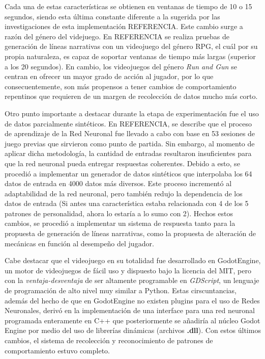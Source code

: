 \documentclass[conference]{IEEEtran}
\begin{document}
Cada una de estas características se obtienen en ventanas de tiempo de 10 o 15 segundos, siendo esta última constante  diferente a la sugerida por las investigaciones de esta implementación REFERENCIA. Este cambio surge a razón del género del videjuego. En REFERENCIA se realiza pruebas de generación de líneas narrativas con un videojuego del género RPG, el cuál por su propia naturaleza, es capaz de soportar ventanas de tiempo más largas (superior a los 20 segundos). En cambio, los videojuegos del género \textit{Run and Gun} se centran en ofrecer un mayor grado de acción al jugador, por lo que consecuentemente, son más propensos a tener cambios de comportamiento repentinos que requieren de un margen de recolección de datos mucho más corto. 

Otro punto importante a destacar durante la etapa de experimentación fue el uso de datos parcialmente sintéticos. En REFERENCIA, se describe que el proceso de aprendizaje de la Red Neuronal fue llevado a cabo con base en 53 sesiones de juego previas que sirvieron como punto de partida. Sin embargo, al momento de aplicar dicha metodología, la cantidad de entradas resultaron insuficientes para que la red neuronal pueda entregar respuestas coherentes. Debido a esto, se procedió a implementar un generador de datos sintéticos que interpolaba los 64 datos de entrada en 4000 datos más diversos. Este proceso incrementó al adaptabilidad de la red neuronal, pero también redujo la dependencia de los datos de entrada (Si antes una característica estaba relacionada con 4 de los 5 patrones de personalidad, ahora lo estaría a lo sumo con 2). Hechos estos cambios, se procedió a implementar un sistema de respuesta tanto para la propuesta de generación de líneas narrativas, como la propuesta de alteración de mecánicas en función al desempeño del jugador.

Cabe destacar que el videojuego en su totalidad fue desarrollado en GodotEngine, un motor de videojuegos de fácil uso y dispuesto bajo la licencia del MIT, pero con la \textit{ventaja-desventaja} de ser altamente programable en \textit{GDScript}, un lenguaje de programación de alto nivel muy similar a Python. Estas cirscuntancias, además del hecho de que en GodotEngine no existen plugins para el uso de Redes Neuronales, derivó en la implementación de una interface para una red neuronal programada enteramente en C++ que posteriormente se añadiría al núcleo Godot Engine por medio del uso de librerías dinámicas (archivos \textbf{.dll}). Con estos últimos cambios, el sistema de recolección y reconocimiento de patrones de comportamiento estuvo completo. 
\end{document}
